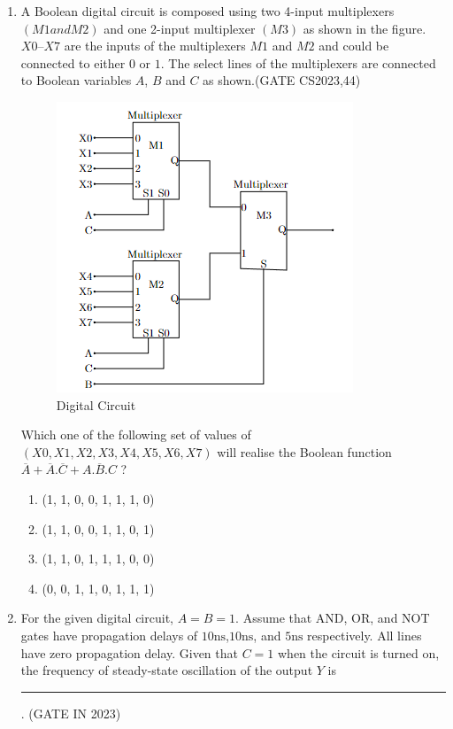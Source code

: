 \begin{enumerate}
\item A Boolean digital circuit is composed using two 4-input multiplexers $(M1 and M2)$ and one 2-input multiplexer $(M3)$ as shown in the figure. $X0$–$X7$ are the inputs of the multiplexers $M1$ and $M2$ and could be connected to either $0$ or $1$. The select lines of the multiplexers are connected to Boolean variables $A$, $B$ and $C$ as shown.\hfill(GATE CS2023,44)

\begin{figure}[H]
    \centering
        \includegraphics[width=\columnwidth]{figs/Multiplexer.png}
    \caption{Digital Circuit}
    \label{fig:Multiplexer}
\end{figure}

Which one of the following set of values of $(X0, X1, X2, X3, X4, X5, X6, X7)$ will realise the Boolean function 
$\overline{A} + \overline{A}.\overline{C}+A.\overline{B}.C $ ?
 \begin{enumerate}
     \item (1, 1, 0, 0, 1, 1, 1, 0)
     \item (1, 1, 0, 0, 1, 1, 0, 1)
     \item (1, 1, 0, 1, 1, 1, 0, 0)
     \item (0, 0, 1, 1, 0, 1, 1, 1)
 \end{enumerate}
\item For the given digital circuit, $A = B = 1$. Assume that AND, OR, and NOT gates have propagation delays of $10\mathrm{ns}$,$10\mathrm{ns}$, and $5\mathrm{ns}$ respectively. All lines have zero
propagation delay. Given that $C = 1$ when the circuit is turned on, the frequency of steady-state oscillation of the output $Y$  is  \rule{30pt}{1pt}.
\hfill (GATE IN 2023)
\begin{figure}[H]
        \centering  
        

\end{figure}
\end{enumerate}
